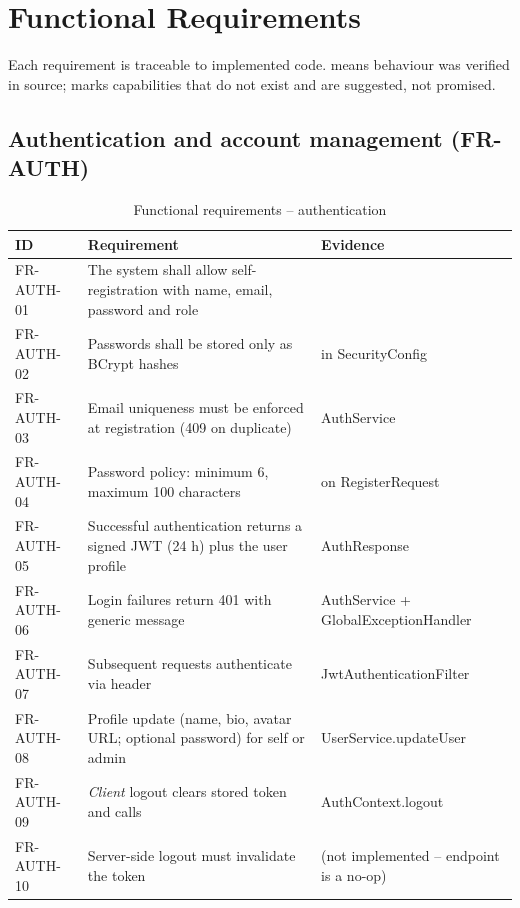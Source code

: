\section{Functional Requirements}
\label{sec:functional-requirements}

Each requirement is traceable to implemented code.  means behaviour was verified in source;  marks capabilities that do not exist and are suggested, not promised.

\subsection{Authentication and account management (FR-AUTH)}
\begin{table}[H]
\centering
\caption{Functional requirements -- authentication}
\label{tab:fr-auth}
\begin{tabular}{@{}C{1.5cm}L{8.6cm}L{3.9cm}@{}}
\toprule
\textbf{ID} & \textbf{Requirement} & \textbf{Evidence} \\
\midrule
FR-AUTH-01 & The system shall allow self-registration with name, email, password and role &  \\
FR-AUTH-02 & Passwords shall be stored only as BCrypt hashes &  in SecurityConfig \\
FR-AUTH-03 & Email uniqueness must be enforced at registration (409 on duplicate) & AuthService  \\
FR-AUTH-04 & Password policy: minimum 6, maximum 100 characters &  on RegisterRequest \\
FR-AUTH-05 & Successful authentication returns a signed JWT (24 h) plus the user profile & AuthResponse \\
FR-AUTH-06 & Login failures return 401  with generic message & AuthService + GlobalExceptionHandler \\
FR-AUTH-07 & Subsequent requests authenticate via  header & JwtAuthenticationFilter \\
FR-AUTH-08 & Profile update (name, bio, avatar URL; optional password) for self or admin & UserService.updateUser \\
FR-AUTH-09 & \emph{Client} logout clears stored token and calls  & AuthContext.logout \\
FR-AUTH-10 & Server-side logout must invalidate the token &  (not implemented -- endpoint is a no-op) \\
\bottomrule
\end{tabular}
\end{table}

